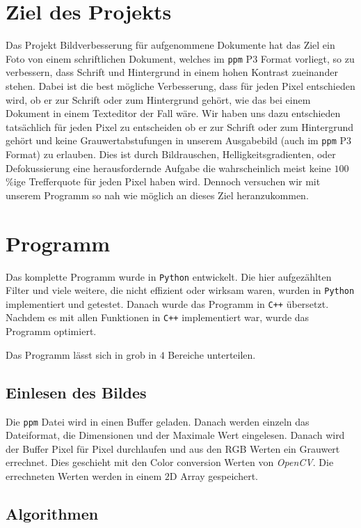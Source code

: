 \documentclass[sigconf]{acmart}
\begin{document}
\section{Ziel des Projekts}
Das Projekt Bildverbesserung für aufgenommene Dokumente hat das Ziel
ein Foto von einem schriftlichen Dokument, welches im \texttt{ppm} P$3$
Format vorliegt, so zu verbessern, dass Schrift und Hintergrund in
einem hohen Kontrast zueinander stehen. Dabei ist die best mögliche
Verbesserung, dass für jeden Pixel entschieden wird, ob er zur Schrift
oder zum Hintergrund gehört, wie das bei einem Dokument in einem
Texteditor der Fall wäre. Wir haben uns dazu entschieden tatsächlich
für jeden Pixel zu entscheiden ob er zur Schrift oder zum Hintergrund
gehört und keine Grauwertabstufungen in unserem Ausgabebild (auch im
\texttt{ppm} P$3$ Format) zu erlauben. Dies ist durch Bildrauschen,
Helligkeitsgradienten, oder Defokussierung eine herausfordernde
Aufgabe die wahrscheinlich meist keine $100$\%ige Trefferquote für jeden
Pixel haben wird. Dennoch versuchen wir mit unserem Programm so nah
wie möglich an dieses Ziel heranzukommen.

\section{Programm}
Das komplette Programm wurde in \texttt{Python} entwickelt. Die hier
aufgezählten Filter und viele weitere, die nicht effizient oder
wirksam waren, wurden in \texttt{Python} implementiert und
getestet. Danach wurde das Programm in \texttt{C++} übersetzt. Nachdem
es mit allen Funktionen in \texttt{C++} implementiert war, wurde das
Programm optimiert.

Das Programm lässt sich in grob in $4$ Bereiche unterteilen.

\subsection{Einlesen des Bildes}
Die \texttt{ppm} Datei wird in einen Buffer geladen. Danach werden
einzeln das Dateiformat, die Dimensionen und der Maximale Wert
eingelesen.  Danach wird der Buffer Pixel für Pixel durchlaufen und
aus den RGB Werten ein Grauwert errechnet. Dies geschieht mit den
Color conversion Werten von \emph{OpenCV}. Die errechneten Werten werden in
einem $2$D Array gespeichert.

\subsection{Algorithmen}
\end{document}
